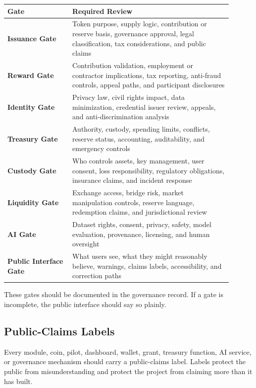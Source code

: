 \documentclass[12pt]{article}
\begin{document}
\begin{longtable}{>{\bfseries}p{0.26\linewidth}p{0.64\linewidth}}
\toprule
Gate & Required Review \\
\midrule
Issuance Gate & Token purpose, supply logic, contribution or reserve basis, governance approval, legal classification, tax considerations, and public claims \\
Reward Gate & Contribution validation, employment or contractor implications, tax reporting, anti-fraud controls, appeal paths, and participant disclosures \\
Identity Gate & Privacy law, civil rights impact, data minimization, credential issuer review, appeals, and anti-discrimination analysis \\
Treasury Gate & Authority, custody, spending limits, conflicts, reserve status, accounting, auditability, and emergency controls \\
Custody Gate & Who controls assets, key management, user consent, loss responsibility, regulatory obligations, insurance claims, and incident response \\
Liquidity Gate & Exchange access, bridge risk, market manipulation controls, reserve language, redemption claims, and jurisdictional review \\
AI Gate & Dataset rights, consent, privacy, safety, model evaluation, provenance, licensing, and human oversight \\
Public Interface Gate & What users see, what they might reasonably believe, warnings, claims labels, accessibility, and correction paths \\
\bottomrule
\end{longtable}

These gates should be documented in the governance record. If a gate is incomplete, the public interface should say so plainly.

\subsection{Public-Claims Labels}

Every module, coin, pilot, dashboard, wallet, grant, treasury function, AI service, or governance mechanism should carry a public-claims label. Labels protect the public from misunderstanding and protect the project from claiming more than it has built.
\end{document}
